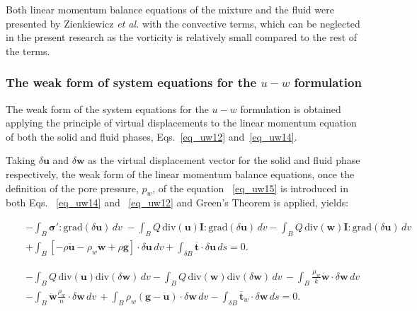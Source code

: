 \documentclass[preprint,12pt,a4paper]{elsarticle}
\begin{document}
Both linear momentum balance equations of the mixture and the fluid were presented by Zienkiewicz \textit{et al.} \cite{Zienkiewicz99} with the convective terms, which can be neglected in the present research as the vorticity is relatively small compared to the rest of the terms.

\subsubsection{The weak form of system equations for the $u-w$ formulation}
\label{subsec:21_a}
The weak form of the system equations for the $u-w$ formulation is obtained applying the principle of virtual displacements to the   linear momentum   equation of both the solid and fluid phases, Eqs.~\eqref{eq_uw12} and~\eqref{eq_uw14}.

Taking $\delta\boldsymbol{u}$ and $\delta \boldsymbol{w}$ as the virtual displacement vector for the solid and fluid phase respectively, the weak form of the linear momentum balance equations, once the definition of the pore pressure, $p_w$, of the equation ~\eqref{eq_uw15} is introduced in both Eqs. ~\eqref{eq_uw14} and ~\eqref{eq_uw12} and Green's Theorem is applied, yields:

\begin{eqnarray} \label{eq_uw19_2}
&&-\int_B \boldsymbol{ \sigma'}:\mbox{grad}(\delta\boldsymbol{u}) \, dv \; -\int_B Q \, \mbox{div}(\boldsymbol{u}) \boldsymbol{I}:\mbox{grad}(\delta\boldsymbol{u}) \, dv  - \int_B Q \, \mbox{div}(\boldsymbol{w}) \boldsymbol{I} : \mbox{grad}(\delta\boldsymbol{u}) \, dv
\nonumber \\
&&+ \int_B \left[-\rho\boldsymbol{\ddot{u}}-\rho_w\boldsymbol{\ddot{w}}+\rho\boldsymbol{g}\right]\cdot\delta\boldsymbol{u} \, dv + \int_{\delta B}\boldsymbol{\overline{t}}\cdot\delta\boldsymbol{u} \, ds=0.
\end{eqnarray}

\begin{eqnarray} \label{eq_uw20_2}
&&-\int_B Q \, \mbox{div} (\boldsymbol{u}) \mbox{div}(\delta \boldsymbol{w}) \, dv  -\int_B Q \, \mbox{div} (\boldsymbol{w}) \mbox{div}(\delta \boldsymbol{w}) \, dv \, -\int_B\frac{\mu_w}{k}\boldsymbol{\dot{w}}\cdot\delta \boldsymbol{w} \, dv
\nonumber\\
&&- \int_B \boldsymbol{\ddot{w}}\frac{\rho_w}{n} \cdot\delta \boldsymbol{w} \, dv \, +\int_B \rho_w(\boldsymbol{g}-\boldsymbol{\ddot{u}}) \cdot\delta \boldsymbol{w} \, dv -\int_{\delta B}\boldsymbol{\overline{t}}_w\cdot\delta\boldsymbol{w} \, ds =0.
\end{eqnarray}\\
\end{document}
